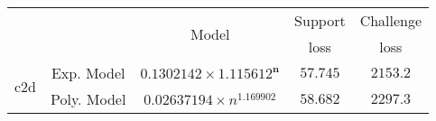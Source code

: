 \begin{tabular}{ccccc} 
\hline 
 &  & \multirow{2}{*}{Model} & Support & Challenge\tabularnewline 
 &  &  & loss  & loss\tabularnewline 
\hline 
\hline 
\multirow{2}{*}{c2d} & Exp. Model & $\mathbf{0.1302142\times 1.115612^{n}}$ & $\mathbf{57.745}$ & $\mathbf{2153.2}$ \tabularnewline 
 & Poly. Model & $0.02637194\times n^{1.169902}$ & $58.682$ & $2297.3$ \tabularnewline 
\hline 
\end{tabular} 

